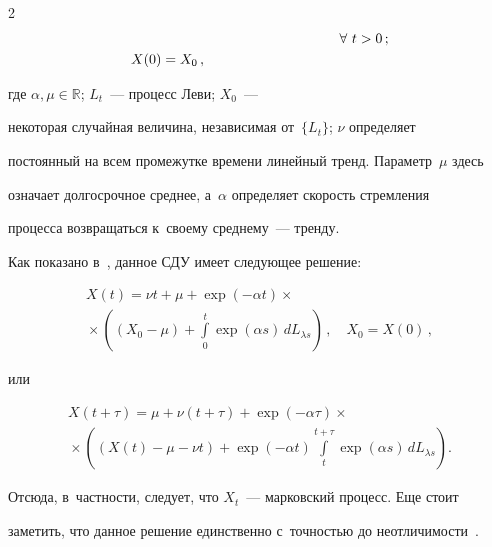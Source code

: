 \begin{multicols}{2}
\begin{align*}
&\hspace{45mm}\forall\  t>0\,;  \\


X(0) &= X_0\,,  


       \end{align*}


         где $\alpha, \mu \in \mathbb{R}$; $L_t$~--- процесс Леви; $X_0$~--- 


некоторая случайная величина, независимая от~$\{L_t\}$; $\nu$ определяет 


постоянный на всем промежутке времени линейный тренд. Параметр~$\mu$ здесь 


означает долгосрочное среднее, а~$\alpha$ определяет скорость стремления 


процесса возвращаться к~своему среднему~--- тренду.





Как показано в~\cite{Protter}, данное СДУ имеет сле\-ду\-ющее решение:


\begin{multline*}


X(t) =\nu t + \mu + \exp\left(-\alpha t\right) \times{}\\


{}\times


\left(


\left(X_0 - \mu \right)+ \int\limits_0^t\exp(\alpha  s)\,dL_{\lambda s}\right)\,, 


\quad X_0 = X(0)\,,


\end{multline*}


или


\begin{multline}


X(t + \tau) =\mu +\nu  (t + \tau) +   \exp


\left(-\alpha \tau\right)\times{}\\


\!\!{}\times\! \left(\!\!


(X(t) - \mu - \nu  t) + \exp(- \alpha t)\!\int\limits_t^{t + \tau}\!\!


\exp(\alpha s)\,dL_{\lambda s}\!\right).\!\!\!\!


\label{explicit_ou}


\end{multline}


Отсюда, в~частности, следует, что $X_t$~--- марковский процесс. Еще стоит 


заметить, что данное решение единственно с~точностью до неотличимости~\cite{sato}. 



\end{multicols}
